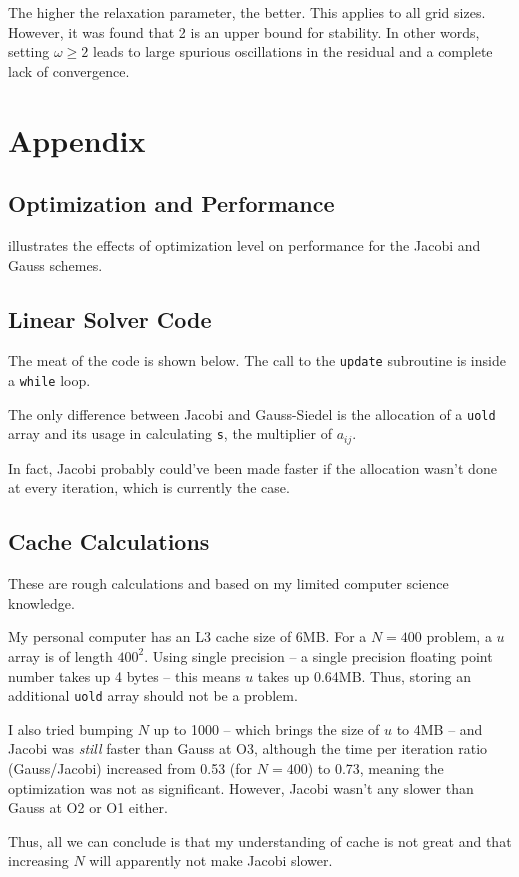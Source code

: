 \documentclass{SelimArticle}
\begin{document}
The higher the relaxation parameter, the better. This applies to all grid sizes. However, it was found that 2
is an upper bound for stability. In other words, setting $\omega \ge 2$ leads to
large spurious oscillations in the residual and a complete lack of convergence.

\newpage
\appendix
\section{Appendix}
\subsection{Optimization and Performance}
 illustrates the effects of optimization level on performance for the Jacobi and Gauss schemes.

\subsection{Linear Solver Code}
The meat of the code is shown below. The call to the \texttt{update} subroutine is inside a \texttt{while} loop.

The only difference between Jacobi and Gauss-Siedel is the allocation
of a \texttt{uold} array and its usage in calculating \texttt{s}, the multiplier of $a_{ij}$.

In fact, Jacobi probably could've been made faster if the allocation wasn't done at every iteration, which is currently
the case.

\subsection{Cache Calculations}
These are rough calculations and based on my limited computer science knowledge.

My personal computer has an L3 cache size of 6MB. For a $N = 400$ problem, a $u$ array is of length $400^2$.
Using single precision -- a single precision floating point number takes up 4 bytes -- this means $u$ takes up
0.64MB.  Thus, storing an additional \texttt{uold} array should not be a problem.

I also tried bumping $N$ up to 1000 -- which brings the size of $u$ to 4MB -- and Jacobi
was \textit{still} faster than Gauss at O3, although the time per iteration ratio (Gauss/Jacobi) increased
from 0.53 (for $N = 400$) to 0.73, meaning the optimization was not as significant. However, Jacobi wasn't any
slower than Gauss at O2 or O1 either.

Thus, all we can conclude is that my understanding of cache is not great and that increasing $N$ will
apparently not make Jacobi slower.
\end{document}
